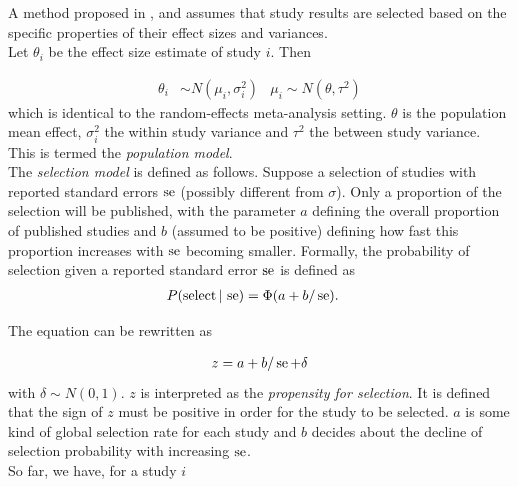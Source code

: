\documentclass[11pt,a4paper,twoside]{book}\usepackage[]{graphicx}\usepackage[]{color}
\begin{document}
A method proposed in \citet{Copas1}, \citet{Copas2} and \citet{Copas3} assumes that study results are selected based on the specific properties of their effect sizes and variances. \\
Let $\theta_i$ be the effect size estimate of study $i$. Then 

\begin{align}
\theta_i &\sim N(\mu_i, \sigma_i^2) &
\mu_i \sim N(\theta, \tau^2) \label{eq:population.model}
\end{align}
which is identical to the random-effects meta-analysis setting. $\theta$ is the population mean effect, $\sigma_i^2$ the within study variance and $\tau^2$ the between study variance. This is termed the \textit{population model}. \\
The \textit{selection model} is defined as follows. Suppose a selection of studies with reported %
standard errors $\operatorname{se}$ (possibly different from $\sigma$). Only a proportion of the selection will be published, with the parameter $a$ defining the overall proportion of published studies and $b$ (assumed to be positive) defining how fast this proportion increases with $\operatorname{se}$ becoming smaller. Formally, the probability of selection given a reported standard error $\operatorname{se}$ is defined as
\begin{align}
P(\textrm{select}\given \se) &= \Phi(a + b/\se). \nonumber %
\end{align}

The equation can be rewritten as 

\begin{align}
z = a + b/\se + \delta \nonumber %
\end{align}
with $\delta \sim N(0,1)$. $z$ is interpreted as the \textit{propensity for selection}. It is defined that the sign of $z$ must be positive in order for the study to be selected.
$a$ is some kind of global selection rate for each study and $b$ decides about the decline of selection probability with increasing $\operatorname{se}$.\\
So far, we have, for a study $i$
\end{document}

